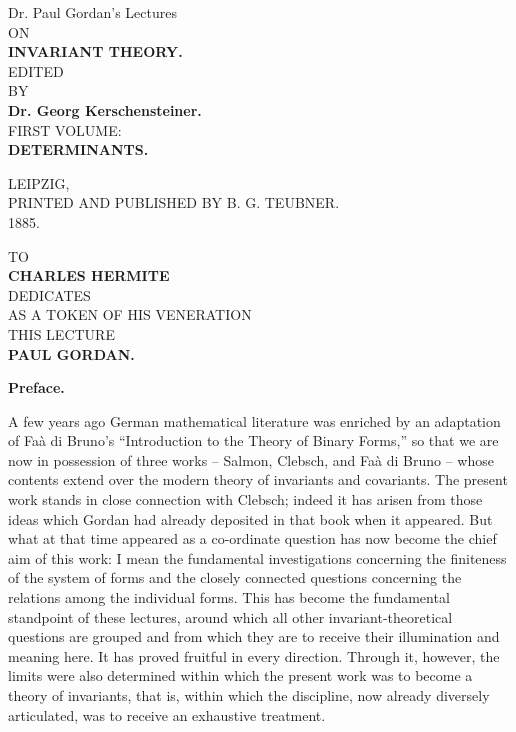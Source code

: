 \documentclass[10pt]{article}
\newcommand{\TeubnerMark}{\begin{center}\setlength{\fboxsep}{1pt}\fbox{\scriptsize\bfseries B\,G\,T}\end{center}}
\begin{document}
\small

\begin{center}
{\large Dr. Paul Gordan's Lectures}\\[0.45em]
{\scriptsize ON}\\[0.65em]
{\LARGE\bfseries INVARIANT THEORY.}\\[1.6em]
{\scriptsize EDITED}\\[0.45em]
{\scriptsize BY}\\[0.65em]
{\bfseries Dr. Georg Kerschensteiner.}\\[1.6em]
{\scriptsize FIRST VOLUME:}\\[0.45em]
{\large\bfseries DETERMINANTS.}\\[1.5em]
\TeubnerMark
\vfill
{\small LEIPZIG,}\\[0.25em]
{\scriptsize PRINTED AND PUBLISHED BY B. G. TEUBNER.}\\[0.25em]
{\small 1885.}
\end{center}

\newpage

\begin{center}
{\small TO}\\[0.9em]
{\Large\bfseries CHARLES HERMITE}\\[0.8em]
{\scriptsize DEDICATES}\\[0.8em]
{\small AS A TOKEN OF HIS VENERATION}\\[0.8em]
{\scriptsize THIS LECTURE}\\[0.8em]
{\bfseries PAUL GORDAN.}
\end{center}

\newpage

\begin{center}
{\bfseries Preface.}
\end{center}

A few years ago German mathematical literature was enriched by an adaptation of Faà di Bruno's “Introduction to the Theory of Binary Forms,” so that we are now in possession of three works -- Salmon, Clebsch, and Faà di Bruno -- whose contents extend over the modern theory of invariants and covariants. The present work stands in close connection with Clebsch; indeed it has arisen from those ideas which Gordan had already deposited in that book when it appeared. But what at that time appeared as a co-ordinate question has now become the chief aim of this work: I mean the fundamental investigations concerning the finiteness of the system of forms and the closely connected questions concerning the relations among the individual forms. This has become the fundamental standpoint of these lectures, around which all other invariant-theoretical questions are grouped and from which they are to receive their illumination and meaning here. It has proved fruitful in every direction. Through it, however, the limits were also determined within which the present work was to become a theory of invariants, that is, within which the discipline, now already diversely articulated, was to receive an exhaustive treatment.
\end{document}
